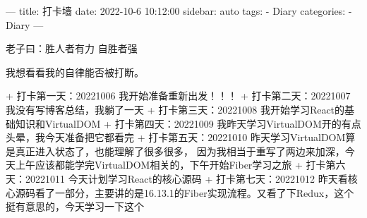 ---
title: 打卡墙
date: 2022-10-6 10:12:00
sidebar: auto
tags:
 - Diary
categories:
 -  Diary
---

老子曰：胜人者有力 自胜者强

我想看看我的自律能否被打断。

+ 打卡第一天：20221006 我开始准备重新出发！！！
+ 打卡第二天：20221007 我没有写博客总结，我躺了一天
+ 打卡第三天：20221008 我开始学习React的基础知识和VirtualDOM
+ 打卡第四天：20221009 我昨天学习VirtualDOM开的有点头晕，我今天准备把它都看完
+ 打卡第五天：20221010 昨天学习VirtualDOM算是真正进入状态了，也能理解了很多很多，
  因为我相当于重写了两边来加深，今天上午应该都能学完VirtualDOM相关的，下午开始Fiber学习之旅
+ 打卡第六天：20221011 今天计划学习React的核心源码
+ 打卡第七天：20221012 昨天看核心源码看了一部分，主要讲的是16.13.1的Fiber实现流程。又看了下Redux，这个挺有意思的，今天学习一下这个
